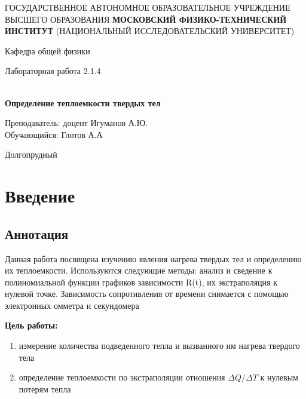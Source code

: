 \documentclass[12pt,a4paper]{article}
\author{Глотов Алексей}
\begin{document}
\newpage
\begin{center}
\footnotesize{{ГОСУДАРСТВЕННОЕ АВТОНОМНОЕ ОБРАЗОВАТЕЛЬНОЕ УЧРЕЖДЕНИЕ}\break
{ВЫСШЕГО ОБРАЗОВАНИЯ}
\break
{\bf {МОСКОВСКИЙ ФИЗИКО-ТЕХНИЧЕСКИЙ ИНСТИТУТ}}
\break
\small{(НАЦИОНАЛЬНЫЙ ИССЛЕДОВАТЕЛЬСКИЙ УНИВЕРСИТЕТ)}}
\break
\hfill \break
\hfill \break
\begin{center}
\normalsize{Кафедра общей физики}
\end{center}
\hfill \break
\hfill \break
\hfill \break
\hfill \break

\begin{center}
\normalsize {Лабораторная работа 2.1.4}
\end{center}
\hfill \break\\
\large{\textbf{Определение теплоемкости твердых тел}}
\end{center}
\begin{flushleft}
\hfill \break
\hfill \break
\hfill \break
\hfill \break
\hfill \break
\hfill \break
\hfill \break
\hfill \break
\hfill \break
\hfill \break
\hangindent=9cm
\normalsize{Преподаватель:}\hfill
\normalsize{доцент Игуманов А.Ю.}\\
\hfill \break
\normalsize{Обучающийся:}\hfill
\normalsize{Глотов А.А} \\
\hfill \break
\end{flushleft}
\hfill \break
\hfill \break
\hfill \break
\hfill \break
\hfill \break
\hfill \break
\hfill \break
\hfill \break
\hfill \break
\hfill \break
\hfill \break

\begin{center}
Долгопрудный 
\end{center}
\thispagestyle{empty}

\newpage

\section{Введение}
\subsection{Аннотация}

Данная работа посвящена изучению явления нагрева твердых тел и определению их теплоемкости. Используются следующие методы: анализ и сведение к полиномиальной функции графиков зависимости R(t), их экстраполяция к нулевой точке. Зависимость сопротивления от времени снимается с помощью электронных омметра и секундомера 

\textbf{Цель работы:}  \begin{enumerate}
	\item  измерение количества подведенного тепла и вызванного им нагрева твердого тела
	\item определение теплоемкости по экстраполяции отношения $\Delta{Q}/\Delta{T}$ к нулевым потерям тепла
\end{enumerate}
\end{document}
